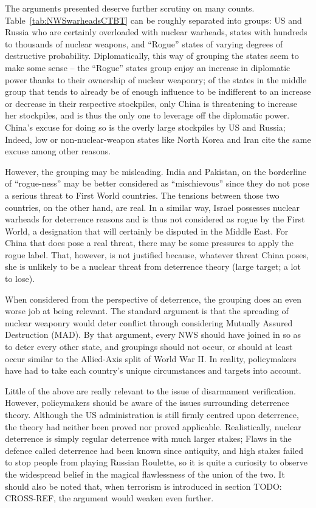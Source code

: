 \documentclass[twoside,titlepage,11pt,twocolumn,a4paper]{article}
\begin{document}
The arguments presented deserve further scrutiny on many
counts. Table~\ref{tab:NWSwarheadsCTBT} can be roughly separated into
groups: US and Russia who are certainly overloaded with nuclear
warheads, states with hundreds to thousands of nuclear weapons, and
``Rogue'' states of varying degrees of destructive
probability. Diplomatically, this way of grouping the states seem to
make some sense -- the ``Rogue'' states group enjoy an increase in
diplomatic power thanks to their ownership of nuclear weaponry; of the
states in the middle group that tends to already be of enough
influence to be indifferent to an increase or decrease in their
respective stockpiles, only China is threatening to increase her
stockpiles, and is thus the only one to leverage off the diplomatic
power. China's excuse for doing so is the overly large stockpiles by
US and Russia; Indeed, low or non-nuclear-weapon states like North
Korea and Iran cite the same excuse among other reasons. 

However, the grouping may be misleading. India and Pakistan, on the
borderline of ``rogue-ness'' may be better considered as
``mischievous'' since they do not pose a serious threat to First World
countries. The tensions between those two countries, on the other
hand, are real. In a similar way, Israel possesses nuclear warheads for
deterrence reasons and is thus not considered as rogue by the First
World, a designation that will certainly be disputed in the Middle
East. For China that does pose a real threat, there may be some
pressures to apply the rogue label. That, however, is not justified
because, whatever threat China poses, she is unlikely to be a nuclear
threat from deterrence theory (large target; a lot to lose).

When considered from the perspective of deterrence, the grouping does
an even worse job at being relevant. The standard argument is that the
spreading of nuclear weaponry would deter conflict through considering
Mutually Assured Destruction (MAD). By that argument, every NWS should
have joined in so as to deter every other state, and groupings should
not occur, or should at least occur similar to the Allied-Axis split
of World War II. In reality, policymakers have had to take each
country's unique circumstances and targets into account. 

Little of the above are really relevant to the issue of disarmament
verification. However, policymakers should be aware of the issues
surrounding deterrence theory. Although the US administration is still
firmly centred upon deterrence, the theory had neither been proved nor
proved applicable. \citep{zeroNuke2011Economist,
  deterrenceFail2008Guardian, deterrenceFail2011NAPF} Realistically,
nuclear deterrence is simply regular deterrence with much larger
stakes; Flaws in the defence called deterrence had been known since
antiquity, and high stakes failed to stop people from playing Russian
Roulette, so it is quite a curiosity to observe the widespread belief
in the magical flawlessness of the union of the two.  It should also
be noted that, when terrorism is introduced in section TODO:
CROSS-REF, the argument would weaken even further.
\end{document}
